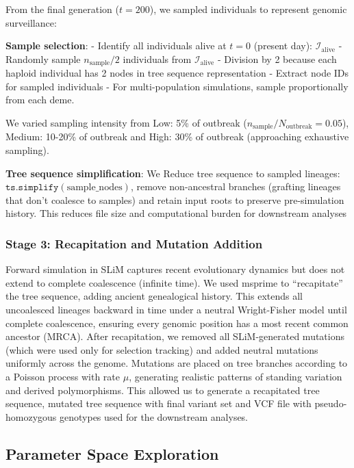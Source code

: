 \documentclass[
  11pt,
]{article}
\begin{document}
From the final generation (\(t = 200\)), we sampled individuals to
represent genomic surveillance:

\textbf{Sample selection}: - Identify all individuals alive at \(t = 0\)
(present day): \(\mathcal{I}_{\text{alive}}\) - Randomly sample
\(n_{\text{sample}}/2\) individuals from \(\mathcal{I}_{\text{alive}}\)
- Division by 2 because each haploid individual has 2 nodes in tree
sequence representation - Extract node IDs for sampled individuals - For
multi-population simulations, sample proportionally from each deme.

We varied sampling intensity from Low: 5\% of outbreak
(\(n_{\text{sample}}/N_{\text{outbreak}} = 0.05\)), Medium: 10-20\% of
outbreak and High: 30\% of outbreak (approaching exhaustive sampling).

\textbf{Tree sequence simplification}: We Reduce tree sequence to
sampled lineages: \(\texttt{ts.simplify}(\text{sample\_nodes})\), remove
non-ancestral branches (grafting lineages that don't coalesce to
samples) and retain input roots to preserve pre-simulation history. This
reduces file size and computational burden for downstream analyses

\subsubsection{Stage 3: Recapitation and Mutation
Addition}\label{stage-3-recapitation-and-mutation-addition}

Forward simulation in SLiM captures recent evolutionary dynamics but
does not extend to complete coalescence (infinite time). We used msprime
to ``recapitate'' the tree sequence, adding ancient genealogical
history. This extends all uncoalesced lineages backward in time under a
neutral Wright-Fisher model until complete coalescence, ensuring every
genomic position has a most recent common ancestor (MRCA). After
recapitation, we removed all SLiM-generated mutations (which were used
only for selection tracking) and added neutral mutations uniformly
across the genome. Mutations are placed on tree branches according to a
Poisson process with rate \(\mu\), generating realistic patterns of
standing variation and derived polymorphisms. This allowed us to
generate a recapitated tree sequence, mutated tree sequence with final
variant set and VCF file with pseudo-homozygous genotypes used for the
downstream analyses.

\subsection{Parameter Space
Exploration}\label{parameter-space-exploration}
\end{document}
